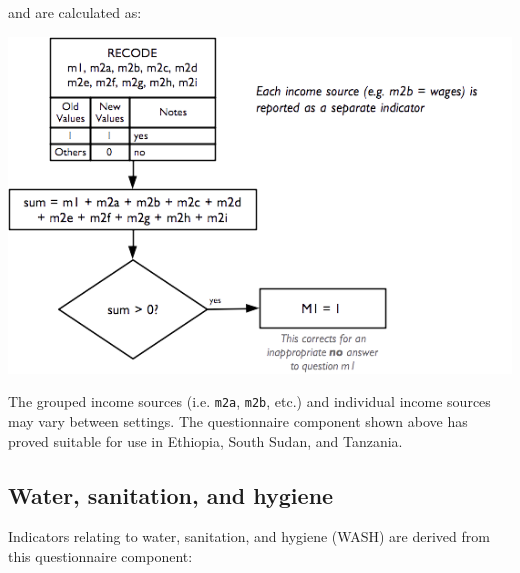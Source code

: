 \documentclass[12pt,a4paper]{book}
\theoremstyle{definition}
\theoremstyle{definition}
\theoremstyle{definition}
\theoremstyle{remark}
\begin{document}
and are calculated as:

\begin{center}\includegraphics[width=7.68in]{figures/indicators23} \end{center}

The grouped income sources (i.e. \texttt{m2a}, \texttt{m2b}, etc.) and
individual income sources may vary between settings. The questionnaire
component shown above has proved suitable for use in Ethiopia, South
Sudan, and Tanzania.

\newpage

\hypertarget{water-sanitation-and-hygiene}{%
\subsection{Water, sanitation, and
hygiene}\label{water-sanitation-and-hygiene}}

Indicators relating to water, sanitation, and hygiene (WASH) are derived
from this questionnaire component:
\end{document}
